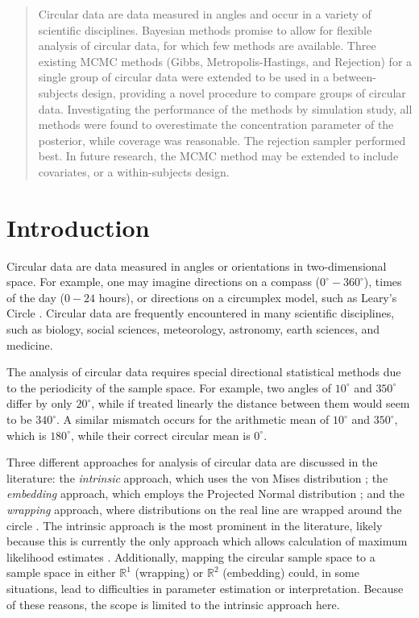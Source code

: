 \documentclass[]{gSCS2e}
\theoremstyle{plain}
\theoremstyle{definition}
\theoremstyle{remark}
\begin{document}
\begin{abstract}
Circular data are data measured in angles and occur in a variety of scientific disciplines. Bayesian methods promise to allow for flexible analysis of circular data, for which few methods are available. Three existing MCMC methods (Gibbs, Metropolis-Hastings, and Rejection) for a single group of circular data were extended to be used in a between-subjects design, providing a novel procedure to compare groups of circular data. Investigating the performance of the methods by simulation study, all methods were found to overestimate the concentration parameter of the posterior, while coverage was reasonable. The rejection sampler performed best. In future research, the MCMC method may be extended to include covariates, or a within-subjects design. 


\end{abstract}

\section{Introduction}

Circular data are data measured in angles or orientations in two-dimensional space. For example, one may imagine directions on a compass ($0^\circ - 360^\circ$), times of the day ($0 - 24$ hours), or directions on a circumplex model, such as Leary's Circle \citep{Leary1957}. Circular data are frequently encountered in many scientific disciplines, such as biology, social sciences, meteorology, astronomy, earth sciences, and medicine. 

The analysis of circular data requires special directional statistical methods due to the periodicity of the sample space. For example, two angles of $10^\circ$ and $350^\circ$ differ by only $20^\circ$, while if treated linearly the distance between them would seem to be $340^\circ$. A similar mismatch occurs for the arithmetic mean of $10^\circ$ and $350^\circ$, which is $180^\circ$,  while their correct circular mean is $0^\circ$. 

Three different approaches for analysis of circular data are discussed in the literature: the \textit{intrinsic} approach, which uses the von Mises distribution \citep{von1918ganzzahligkeit, damien1999fullbayes}; the \textit{embedding} approach, which employs the Projected Normal distribution \citep{Nunez-Antonio2005}; and the \textit{wrapping} approach, where distributions on the real line are wrapped around the circle \citep{ferrari2009wrapping}. The intrinsic approach is the most prominent in the literature, likely because this is currently the only approach which allows calculation of maximum likelihood estimates \citep{ferrari2009wrapping}. Additionally, mapping the circular sample space to a sample space in either $\mathbb{R}^1$ (wrapping) or $\mathbb{R}^2$ (embedding) could, in some situations, lead to difficulties in parameter estimation or interpretation. Because of these reasons, the scope is limited to the intrinsic approach here. %
\end{document}
